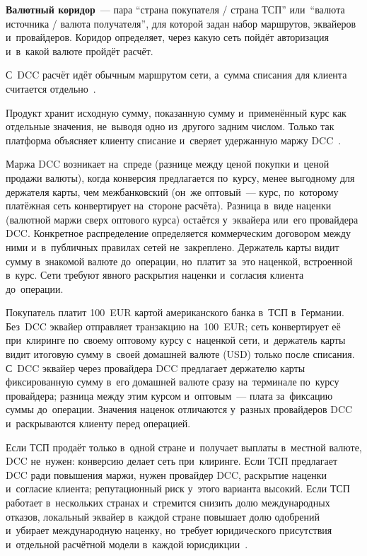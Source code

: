 \textbf{Валютный коридор}~--- пара \enquote{страна покупателя / страна ТСП}
или~\enquote{валюта источника / валюта получателя}, для которой задан набор
маршрутов, эквайеров и~провайдеров. Коридор определяет, через какую сеть
пойдёт авторизация и~в~какой валюте пройдёт расчёт.

С~DCC расчёт идёт обычным маршрутом сети, а~сумма списания для
клиента считается отдельно~\cite{visa-core-rules,mc-tpr}.

Продукт хранит исходную сумму, показанную сумму и~применённый курс как
отдельные значения, не~выводя одно из~другого задним числом. Только так
платформа объясняет клиенту списание и~сверяет удержанную маржу
DCC~\cite{visa-core-rules,mc-tpr}.

Маржа DCC возникает на~спреде (разнице между ценой покупки и~ценой продажи
валюты), когда конверсия предлагается по~курсу, менее выгодному для держателя
карты, чем межбанковский (он~же оптовый~--- курс, по~которому платёжная сеть
конвертирует на~стороне расчёта). Разница в~виде наценки (валютной маржи сверх
оптового курса) остаётся у~эквайера или~его провайдера DCC. Конкретное
распределение определяется коммерческим договором между ними и~в~публичных
правилах сетей не~закреплено. Держатель карты видит сумму в~знакомой валюте
до~операции, но~платит за~это наценкой, встроенной в~курс. Сети требуют явного
раскрытия наценки и~согласия клиента до~операции.

Покупатель платит 100~EUR картой американского банка в~ТСП в~Германии. Без~DCC
эквайер отправляет транзакцию на~100~EUR; сеть конвертирует её при~клиринге
по~своему оптовому курсу с~наценкой сети, и~держатель карты видит итоговую
сумму в~своей домашней валюте (USD) только после списания. С~DCC эквайер через
провайдера DCC предлагает держателю карты фиксированную сумму в~его домашней
валюте сразу на~терминале по~курсу провайдера; разница между этим курсом
и~оптовым~--- плата за~фиксацию суммы до~операции. Значения наценок
отличаются у~разных провайдеров DCC и~раскрываются клиенту перед операцией.

Если ТСП продаёт только в~одной стране и~получает выплаты в~местной валюте, DCC
не~нужен: конверсию делает сеть при~клиринге. Если ТСП
предлагает DCC ради повышения маржи, нужен провайдер DCC, раскрытие
наценки и~согласие клиента; репутационный риск у~этого варианта высокий. Если
ТСП работает в~нескольких странах и~стремится снизить долю международных отказов,
локальный эквайер в~каждой стране повышает долю одобрений и~убирает
международную наценку, но~требует юридического присутствия и~отдельной
расчётной модели в~каждой юрисдикции~\cite{visa-core-rules,mc-tpr}.

